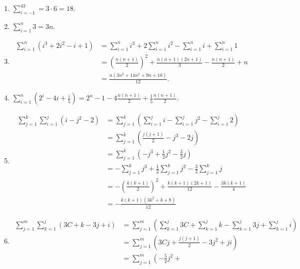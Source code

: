 \documentclass[9pt]{article}
\newcommand{\D}{\displaystyle}
\begin{document}
\begin{enumerate}
      \begin{enumerate}
         \item $\D\sum_{i=-1}^43 = 3 \cdot 6 = 18$.
         \item $\D\sum_{i=1}^n3 = 3n$.
         \item \begin{align*}
                  \sum_{i=1}^n (i^3 + 2i^2 - i + 1) &= \sum_{i=1}^n i^3 +
                     2\sum_{i=1}^ni^2 - \sum_{i=1}^ni + \sum_{i=1}^n1 \\
                  &= \left(\frac{n(n+1)}{2}\right)^2 + \frac{n(n+1)(2n+1)}{3} -
                     \frac{n(n+1)}{2} + n \\
                  &= \frac{n(3n^3 + 14n^2 + 9n + 10)}{12}.
               \end{align*}
         \item $\D\sum_{i=1}^n \left(2^i - 4i + \frac{i}{5}\right) = 2^{n}-1
                -4\frac{n(n+1)}{2} + \frac{1}{5}\frac{n(n+1)}{2}$.
         \item \begin{align*}
                  \sum_{j=1}^k\sum_{i=1}^j (i - j^2 - 2) &=
                     \sum_{j=1}^k\left(\sum_{i=1}^ji - \sum_{i=1}^jj^2 -
                     \sum_{i=1}^j2\right) \\
                     &= \sum_{j=1}^k\left(\frac{j(j+1)}{2} - j^3 -2j\right) \\
                     &= \sum_{j=1}^k\left(-j^3 + \frac{1}{2}j^2 -
                           \frac{3}{2}j \right) \\
                     &= -\sum_{j=1}^kj^3 + \frac{1}{2}\sum_{j=1}^kj^2 -
                           \frac{3}{2}\sum_{j=1}^kj \\
                     &= -\left(\frac{k(k+1)}{2}\right)^2 +
                           \frac{k(k+1)(2k+1)}{12} - \frac{3k(k+1)}{4} \\
                     &= -\frac{k(k + 1)(3k^2 + k + 8)}{12}
               \end{align*}
         \item \begin{align*}
                  \sum_{j=1}^m\sum_{k=1}^j (3C + k - 3j + i) &=
                     \sum_{j=1}^m\left(\sum_{k=1}^j3C + \sum_{k=1}^jk -
                     \sum_{k=1}^j3j + \sum_{k=1}^ji\right) \\
                     &= \sum_{j=1}^m\left(3Cj + \frac{j(j+1)}{2} - 3j^2 +
                           ji\right) \\
                     &= \sum_{j=1}^m\left(-\frac{5}{2}j^2 +

\end{align*}
\end{enumerate}
\end{enumerate}
\end{document}
